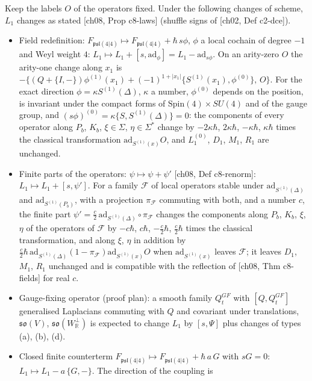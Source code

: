 \begin{proposition}
\label{prop:o-laws}
Keep the labels $O$ of the operators fixed. Under the following changes of scheme, $L_1$ changes as stated [ch08, Prop c8-laws] (shuffle signs of [ch02, Def c2-dce]).
\begin{itemize}
\item[(a)] Field redefinition: $F_{\mathfrak{psl}(4|4)}\mapsto F_{\mathfrak{psl}(4|4)}+\hbar\,s\phi$, $\phi$ a local cochain of degree $-1$ and Weyl weight $4$: $L_1\mapsto L_1+[s,\mathrm{ad}_\phi]=L_1-\mathrm{ad}_{s\phi}$. On an arity-zero $O$ the arity-one change along $x_1$ is $-\big\{(Q+\{I,-\})\phi^{(1)}(x_1)+(-1)^{1+|x_1|}\{S^{(1)}(x_1),\phi^{(0)}\},\,O\big\}$. For the exact direction $\phi=\kappa S^{(1)}(\Delta)$, $\kappa$ a number, $\phi^{(0)}$ depends on the position, is invariant under the compact forms of $\mathrm{Spin}(4)\times SU(4)$ and of the gauge group, and $(s\phi)^{(0)}=\kappa\{S,S^{(1)}(\Delta)\}=0$: the components of every operator along $P_b$, $K_b$, $\xi\in\Sigma$, $\eta\in\Sigma^*$ change by $-2\kappa\hbar$, $2\kappa\hbar$, $-\kappa\hbar$, $\kappa\hbar$ times the classical transformation $\mathrm{ad}_{S^{(1)}(x)}O$, and $L_1^{(0)}$, $D_1$, $M_1$, $R_1$ are unchanged.
\item[(b)] Finite parts of the operators: $\psi\mapsto\psi+\psi'$ [ch08, Def c8-renorm]: $L_1\mapsto L_1+[s,\psi']$. For a family $\mathcal F$ of local operators stable under $\mathrm{ad}_{S^{(1)}(\Delta)}$ and $\mathrm{ad}_{S^{(1)}(P_b)}$, with a projection $\pi_{\mathcal F}$ commuting with both, and a number $c$, the finite part $\psi'=\tfrac c2\,\mathrm{ad}_{S^{(1)}(\Delta)}\circ\pi_{\mathcal F}$ changes the components along $P_b$, $K_b$, $\xi$, $\eta$ of the operators of $\mathcal F$ by $-c\hbar$, $c\hbar$, $-\tfrac c2\hbar$, $\tfrac c2\hbar$ times the classical transformation, and along $\xi$, $\eta$ in addition by $\tfrac c2\hbar\,\mathrm{ad}_{S^{(1)}(\Delta)}(1-\pi_{\mathcal F})\mathrm{ad}_{S^{(1)}(x)}O$ when $\mathrm{ad}_{S^{(1)}(x)}$ leaves $\mathcal F$; it leaves $D_1$, $M_1$, $R_1$ unchanged and is compatible with the reflection of [ch08, Thm c8-fields] for real $c$.
\item[(c)] Gauge-fixing operator (proof plan): a smooth family $Q^{GF}_t$ with $[Q,Q^{GF}_t]$ generalised Laplacians commuting with $Q$ and covariant under translations, $\mathfrak{so}(V)$, $\mathfrak{so}(W_{\mathbb R}^\perp)$ is expected to change $L_1$ by $[s,\Psi]$ plus changes of types (a), (b), (d).
\item[(d)] Closed finite counterterm $F_{\mathfrak{psl}(4|4)}\mapsto F_{\mathfrak{psl}(4|4)}+\hbar\,a\,G$ with $sG=0$: $L_1\mapsto L_1-a\,\{G,-\}$. The direction of the coupling is

\end{itemize}
\end{proposition}
